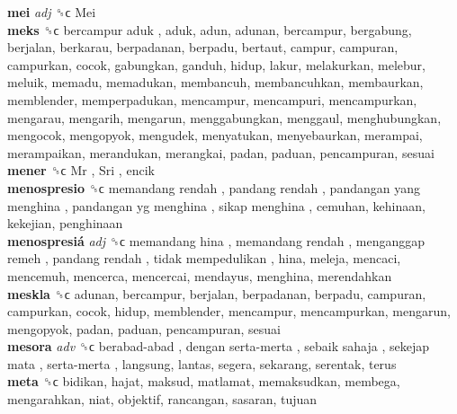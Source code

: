 \textbf{mei} \emph{adj}  ␝ϲ   Mei   \\
\textbf{meks} ␝ϲ   bercampur aduk , aduk, adun, adunan, bercampur, bergabung, berjalan, berkarau, berpadanan, berpadu, bertaut, campur, campuran, campurkan, cocok, gabungkan, ganduh, hidup, lakur, melakurkan, melebur, meluik, memadu, memadukan, membancuh, membancuhkan, membaurkan, memblender, memperpadukan, mencampur, mencampuri, mencampurkan, mengarau, mengarih, mengarun, menggabungkan, menggaul, menghubungkan, mengocok, mengopyok, mengudek, menyatukan, menyebaurkan, merampai, merampaikan, merandukan, merangkai, padan, paduan, pencampuran, sesuai  \\
\textbf{mener} ␝ϲ   Mr ,  Sri , encik  \\
\textbf{menospresio} ␝ϲ   memandang rendah ,  pandang rendah ,  pandangan yang menghina ,  pandangan yg menghina ,  sikap menghina , cemuhan, kehinaan, kekejian, penghinaan  \\
\textbf{menospresiá} \emph{adj}  ␝ϲ   memandang hina ,  memandang rendah ,  menganggap remeh ,  pandang rendah ,  tidak mempedulikan , hina, meleja, mencaci, mencemuh, mencerca, mencercai, mendayus, menghina, merendahkan  \\
\textbf{meskla} ␝ϲ  adunan, bercampur, berjalan, berpadanan, berpadu, campuran, campurkan, cocok, hidup, memblender, mencampur, mencampurkan, mengarun, mengopyok, padan, paduan, pencampuran, sesuai  \\
\textbf{mesora} \emph{adv}  ␝ϲ   berabad-abad ,  dengan serta-merta ,  sebaik sahaja ,  sekejap mata ,  serta-merta , langsung, lantas, segera, sekarang, serentak, terus  \\
\textbf{meta} ␝ϲ  bidikan, hajat, maksud, matlamat, memaksudkan, membega, mengarahkan, niat, objektif, rancangan, sasaran, tujuan  \\
